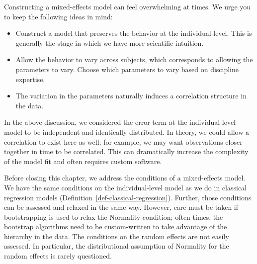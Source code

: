 \documentclass[
  letterpaper,
  DIV=11,
  numbers=noendperiod]{scrreprt}
\providecommand{\tightlist}{%
  \setlength{\itemsep}{0pt}\setlength{\parskip}{0pt}}\usepackage{longtable,booktabs,array}
\theoremstyle{definition}
\theoremstyle{definition}
\theoremstyle{remark}
\begin{document}
\begin{tcolorbox}[enhanced jigsaw, bottomrule=.15mm, titlerule=0mm, bottomtitle=1mm, colback=white, coltitle=black, rightrule=.15mm, leftrule=.75mm, toprule=.15mm, toptitle=1mm, left=2mm, opacityback=0, colframe=quarto-callout-note-color-frame, breakable, title=\textcolor{quarto-callout-note-color}{\faInfo}\hspace{0.5em}{Considerations when Building a Mixed-Effects Model}, arc=.35mm, colbacktitle=quarto-callout-note-color!10!white, opacitybacktitle=0.6]

Constructing a mixed-effects model can feel overwhelming at times. We
urge you to keep the following ideas in mind:

\begin{itemize}
\tightlist
\item
  Construct a model that preserves the behavior at the individual-level.
  This is generally the stage in which we have more scientific
  intuition.
\item
  Allow the behavior to vary across subjects, which corresponds to
  allowing the parameters to vary. Choose which parameters to vary based
  on discipline expertise.
\item
  The variation in the parameters naturally induces a correlation
  structure in the data.
\end{itemize}

\end{tcolorbox}

In the above discussion, we considered the error term at the
individual-level model to be independent and identically distributed. In
theory, we could allow a correlation to exist here as well; for example,
we may want observations closer together in time to be correlated. This
can dramatically increase the complexity of the model fit and often
requires custom software.

Before closing this chapter, we address the conditions of a
mixed-effects model. We have the same conditions on the individual-level
model as we do in classical regression models
(Definition~\ref{def-classical-regression}). Further, those conditions
can be assessed and relaxed in the same way. However, care must be taken
if bootstrapping is used to relax the Normality condition; often times,
the bootstrap algorithms need to be custom-written to take advantage of
the hierarchy in the data. The conditions on the random effects are not
easily assessed. In particular, the distributional assumption of
Normality for the random effects is rarely questioned.
\end{document}

